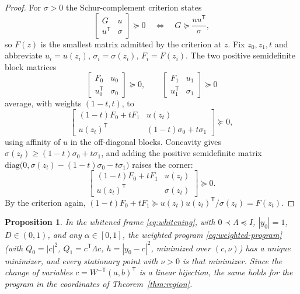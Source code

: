 \documentclass[11pt,onecolumn]{IEEEtran}
\newtheorem{proposition}[theorem]{Proposition}
\begin{document}
\begin{proof}
For $\sigma>0$ the Schur-complement criterion \cite[Sec.~A.5.5]{boyd2004} states
\[
\begin{bmatrix}G&u\\ u^{\mathsf T}&\sigma\end{bmatrix}\succeq0
\quad\Longleftrightarrow\quad
G\succeq\frac{uu^{\mathsf T}}{\sigma},
\]
so $F(z)$ is the smallest matrix admitted by the criterion at $z$.
Fix $z_0,z_1,t$ and abbreviate $u_i=u(z_i)$, $\sigma_i=\sigma(z_i)$,
$F_i=F(z_i)$. The two positive semidefinite block matrices
\[
\begin{bmatrix}F_0&u_0\\ u_0^{\mathsf T}&\sigma_0\end{bmatrix}
\succeq0,
\qquad
\begin{bmatrix}F_1&u_1\\ u_1^{\mathsf T}&\sigma_1\end{bmatrix}
\succeq0
\]
average, with weights $(1-t,t)$, to
\[
\begin{bmatrix}
(1-t)F_0+tF_1&u(z_t)\\
u(z_t)^{\mathsf T}&(1-t)\sigma_0+t\sigma_1
\end{bmatrix}\succeq0,
\]
using affinity of $u$ in the off-diagonal blocks. Concavity gives
$\sigma(z_t)\ge(1-t)\sigma_0+t\sigma_1$, and adding the positive
semidefinite matrix
$\mathrm{diag}\bigl(0,\sigma(z_t)-(1-t)\sigma_0-t\sigma_1\bigr)$
raises the corner:
\[
\begin{bmatrix}
(1-t)F_0+tF_1&u(z_t)\\
u(z_t)^{\mathsf T}&\sigma(z_t)
\end{bmatrix}\succeq0 .
\]
By the criterion again,
$(1-t)F_0+tF_1\succeq u(z_t)u(z_t)^{\mathsf T}/\sigma(z_t)=F(z_t)$.
\end{proof}

\begin{proposition}\label{prop:uniq}
In the whitened frame \eqref{eq:whitening}, with $0\prec\Lambda\preceq
I$, $|y_0|=1$, $D\in(0,1)$, and any $\alpha\in[0,1]$, the weighted
program \eqref{eq:weighted-program} (with $Q_0=|c|^2$,
$Q_1=c^{\mathsf T}\Lambda c$, $h=|y_0-c|^2$, minimized over $(c,\nu)$)
has a unique minimizer, and every stationary point with $\nu>0$ is that
minimizer. Since the change of variables
$c=W^{-\mathsf T}(a,b)^{\mathsf T}$ is a linear bijection, the same
holds for the program in the coordinates of
Theorem~\ref{thm:region}.
\end{proposition}
\end{document}
